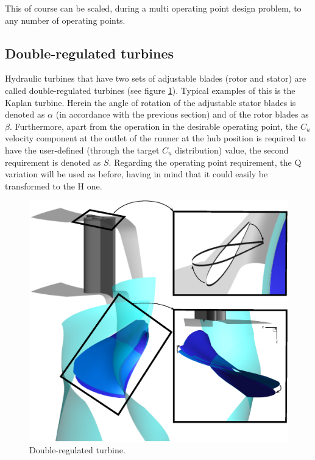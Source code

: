 This of course can be scaled, during a multi operating point design problem, to any number of operating points.     

\subsection{Double-regulated turbines}

Hydraulic turbines that have two sets of adjustable blades (rotor and stator) are called double-regulated turbines (see figure \ref{double}). Typical examples of this is the Kaplan turbine.  
Herein the angle of rotation of the adjustable stator blades is denoted as $\alpha$ (in accordance with the previous section) and of the rotor blades as $\beta$. Furthermore, apart from the operation in the desirable operating point, the $C_u$ velocity component at the outlet of the runner at the hub position is required to have the user-defined (through the target $C_u$ distribution) value, the second requirement is denoted as $S$.     
Regarding the operating point requirement, the Q variation will be used as before, having in mind that it could easily be transformed to the H one.  

\begin{figure}[h!]
\centering
\includegraphics[width=.8\textwidth]{DOUBLE.eps}
\caption{Double-regulated turbine.}
\label{double}
\end{figure}



